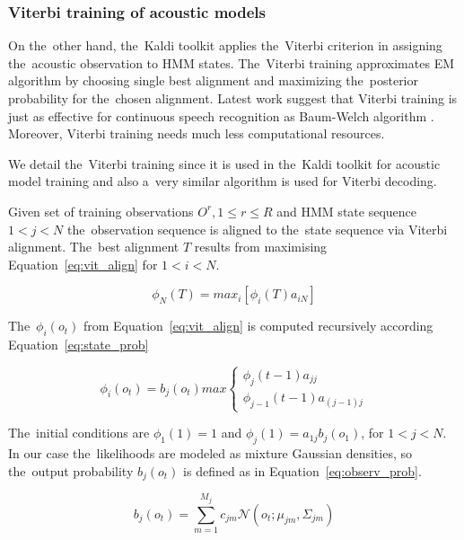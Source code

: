 \subsubsection*{Viterbi training of acoustic models}
On the~other hand, the~Kaldi toolkit applies the~Viterbi criterion in assigning the~acoustic observation to \ac{HMM} states.
The~Viterbi training approximates \ac{EM} algorithm by choosing single best alignment and maximizing the~posterior probability for the~chosen alignment.
Latest work suggest that Viterbi training is just as effective for continuous speech recognition as Baum-Welch algorithm \cite{rodriguez2003comparative}.
Moreover, Viterbi training needs much less computational resources. 

We detail the~Viterbi training since it is used in the~Kaldi toolkit for acoustic model training and also a~very similar algorithm is used for Viterbi decoding.

Given set of training observations $O^r, 1 \le r \le R$ and \ac{HMM} state sequence $1<j< N$ the~observation sequence is aligned to the~state sequence via Viterbi alignment.\cite{buthpitiya2012parallel}
The~best alignment $T$ results from maximising Equation~\ref{eq:vit_align} for $1<i< N$.

\begin{equation}\label{eq:vit_align}
    \phi_N(T)= max_i[\phi_i(T)a_{iN}] 
\end{equation}


The~$\phi_i(o_t)$ from Equation~\ref{eq:vit_align} is computed recursively according Equation~\ref{eq:state_prob}

\begin{equation}\label{eq:state_prob}
    \phi_i(o_t) = b_j(o_t) max \left\{
  \begin{array}{lr}
      \phi_j(t-1)a_{jj}\\
      \phi_{j-1}(t-1)a_{(j-1)j}
  \end{array}
\right.
\end{equation}

The~initial conditions are $\phi_1(1)=1$ and $\phi_j(1)= a_{1j}b_j(o_1)$, for $ 1 < j < N$.
In our case the~likelihoods are modeled as mixture Gaussian densities, so the~output probability $b_j(o_t)$ is defined as in Equation~\ref{eq:observ_prob}.

\begin{equation}\label{eq:observ_prob}
    b_j(o_t) = \sum_{m=1}^{M_j}{c_{jm}\mathcal{N}(o_t; \mu_{jm}, \Sigma_{jm})}
\end{equation}

